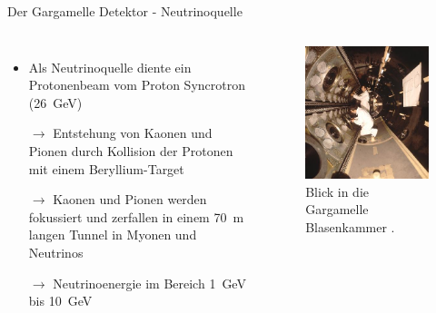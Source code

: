 \documentclass[aspectratio=1610, professionalfonts, 10pt]{beamer}
\begin{document}
\begin{frame}{Der Gargamelle Detektor - Neutrinoquelle}
	\begin{columns}
				\begin{itemize}
					\setlength\itemsep{0.5em}
					\item Als Neutrinoquelle diente ein Protonenbeam vom Proton Syncrotron (\SI{26}{\giga\electronvolt})
					\item[$\rightarrow$] Entstehung von Kaonen und Pionen durch Kollision der Protonen mit einem Beryllium-Target
					\item[$\rightarrow$] Kaonen und Pionen werden fokussiert und zerfallen in einem \SI{70}{\metre} langen Tunnel in Myonen und Neutrinos
					\item[$\rightarrow$] Neutrinoenergie im Bereich \SI{1}{\giga\electronvolt} bis \SI{10}{\giga\electronvolt}
				\end{itemize}

			\begin{figure}
	  			\centering
				\includegraphics[width=\linewidth]{Images/7011042-A5-at-72-dpi.jpg}
	  			\caption{Blick in die Gargamelle Blasenkammer \cite{CERN-EX-7011042}.}
	  			\label{fig:feynman}
			\end{figure}
	\end{columns}
\end{frame}
\end{document}
